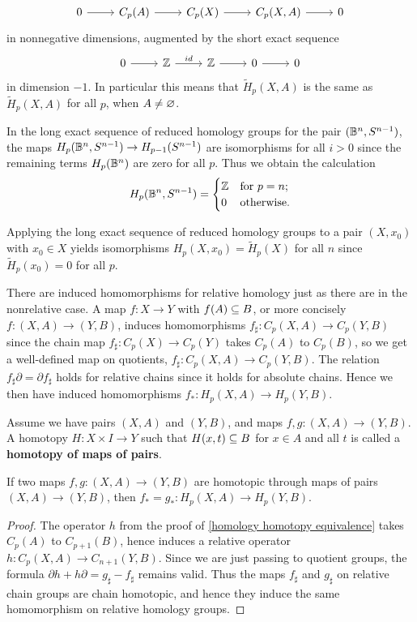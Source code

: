 \[\begin{tikzcd}
0\ar[r]&C_p(A)\ar[r]&C_p(X)\ar[r]&C_p(X,A)\ar[r]&0
\end{tikzcd}\]
in nonnegative dimensions, augmented by the short exact sequence
\[\begin{tikzcd}
0\ar[r]&\Z\ar[r,"id"]&\Z\ar[r]&0\ar[r]&0
\end{tikzcd}\]
in dimension $-1$. In particular this means that $\widetilde{H}_p(X,A)$ is the same as $\widetilde{H}_p(X,A)$ for all $p$, when $A\neq\varnothing$.
\begin{example}
In the long exact sequence of reduced homology groups for the pair $(\mathbb{B}^n,S^{n-1})$, the maps $H_p(\mathbb{B}^n,S^{n-1})\to H_{p-1}(S^{n-1})$ are isomorphisms for all $i>0$
since the remaining terms $H_p(\mathbb{B}^n)$ are zero for all $p$. Thus we obtain the calculation
\[H_p(\mathbb{B}^n,S^{n-1})=\begin{cases}
\mathbb{Z}&\text{for }p=n;\\
0&\text{otherwise}.
\end{cases}\]
\end{example}
\begin{example}
Applying the long exact sequence of reduced homology groups to a pair $(X,x_0)$ with $x_0\in X$ yields isomorphisms $H_p(X,x_0)=\widetilde{H}_p(X)$ for all $n$ since $\widetilde{H}_p(x_0)=0$ for all $p$.
\end{example}
There are induced homomorphisms for relative homology just as there are in the nonrelative case. A map $f:X\to Y$ with $f(A)\subseteq B$, or more concisely $f:(X,A)\to (Y,B)$, induces homomorphisms $f_\sharp:C_p(X,A)\to C_p(Y,B)$ since the chain
map $f_\sharp:C_p(X)\to C_p(Y)$ takes $C_p(A)$ to $C_p(B)$, so we get a well-defined map on quotients, $f_\sharp:C_p(X,A)\to C_p(Y,B)$. The relation $f_\sharp\partial=\partial f_\sharp$ holds for relative chains since it holds for absolute chains. Hence we then have induced homomorphisms $f_*:H_p(X,A)\to H_p(Y,B)$.
\begin{definition}
Assume we have pairs $(X,A)$ and $(Y, B)$, and maps $f,g:(X,A)\to (Y,B)$. A homotopy $H:X\times I\to Y$ such that $H(x,t)\subseteq B$ for $x\in A$ and all $t$ is called a \textbf{homotopy of maps of pairs}.
\end{definition}
\begin{proposition}
If two maps $f,g:(X,A)\to (Y,B)$ are homotopic through maps of
pairs $(X,A)\to(Y, B)$, then $f_*=g_*:H_p(X,A)\to H_p(Y,B)$.
\end{proposition}
\begin{proof}
The operator $h$ from the proof of \cref{homology homotopy equivalence} takes $C_p(A)$ to $C_{p+1}(B)$, hence induces a relative operator $h:C_p(X,A)\to C_{n+1}(Y,B)$. Since we are just passing to quotient groups, the formula $\partial h+h\partial=g_\sharp-f_\sharp$ remains valid. Thus the maps $f_\sharp$ and $g_\sharp$ on relative chain groups are chain homotopic, and hence they induce the same homomorphism on relative homology groups.
\end{proof}
